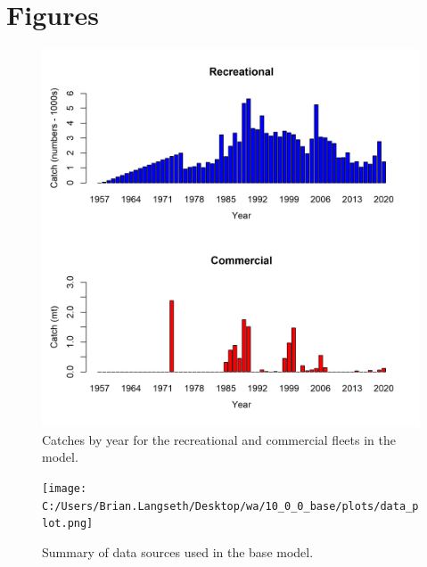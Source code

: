 \documentclass[11pt,
  english,
  a4paper,
]{article}
\begin{document}
\newpage

\clearpage


\hypertarget{figures}{%
\section{Figures}\label{figures}}

\leavevmode\tagmcend\tagstructend


\begin{figure}
\centering
\includegraphics[width=1\textwidth,height=1\textheight]{figs/catches_wa.png}
\caption{Catches by year for the recreational and commercial fleets in the model.\label{fig:catch}}
\end{figure}

\tagmcend\tagstructend


\begin{figure}
\centering
\texttt{[image: C:/Users/Brian.Langseth/Desktop/wa/10\_0\_0\_base/plots/data\_plot.png]}
\caption{Summary of data sources used in the base model.\label{fig:data-plot}}
\end{figure}
\end{document}
